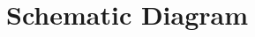 \documentclass[a4paper,11pt]{article}
\newcommand{\chapter}{\section*}
\begin{document}
\chapter{Schematic Diagram}
\begin{figure}[p]
    \vspace*{-2cm}
\end{figure}
\end{document}
